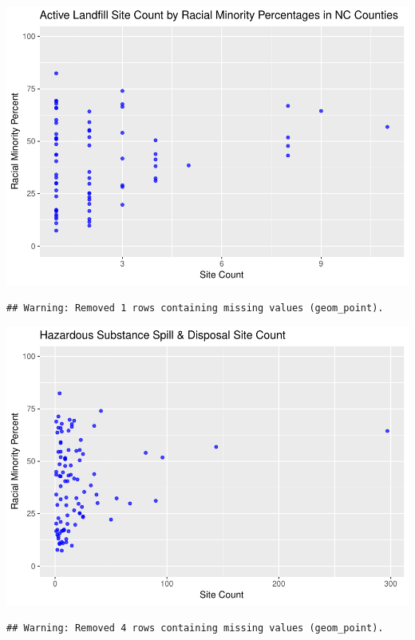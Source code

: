 \documentclass[12pt,]{article}
\begin{document}
\includegraphics{Townsend_Project_Template_files/figure-latex/final visualizations-1.pdf}

\begin{verbatim}
## Warning: Removed 1 rows containing missing values (geom_point).
\end{verbatim}

\includegraphics{Townsend_Project_Template_files/figure-latex/final visualizations-2.pdf}

\begin{verbatim}
## Warning: Removed 4 rows containing missing values (geom_point).
\end{verbatim}
\end{document}

